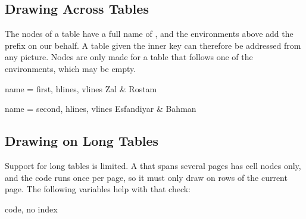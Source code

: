 \subsection{Drawing Across Tables}
The nodes of a table have a full name of \vrb{-}, and the environments above add the prefix on our behalf. A table given the inner key  can therefore be addressed from any  picture. Nodes are only made for a table that follows one of the environments, which may be empty.

\begin{codestore}[st=lib:tikz:name]
    \begin{tblrtikzbelow}\end{tblrtikzbelow}%
    \begin{tblr}{name = first, hlines, vlines}
        Zal & Rostam
    \end{tblr}\hspace{4em}%
    \begin{tblrtikzbelow}\end{tblrtikzbelow}%
    \begin{tblr}{name = second, hlines, vlines}
        Esfandiyar & Bahman
    \end{tblr}%
    \end{codestore}
\begin{center}
\end{center}

\subsection{Drawing on Long Tables}
Support for long tables is limited. A  that spans several pages has cell nodes only, and the code runs once per page, so it must only draw on rows of the current page. The following variables help with that check:
\begin{describelist*}{code, no index}
\end{describelist*}

